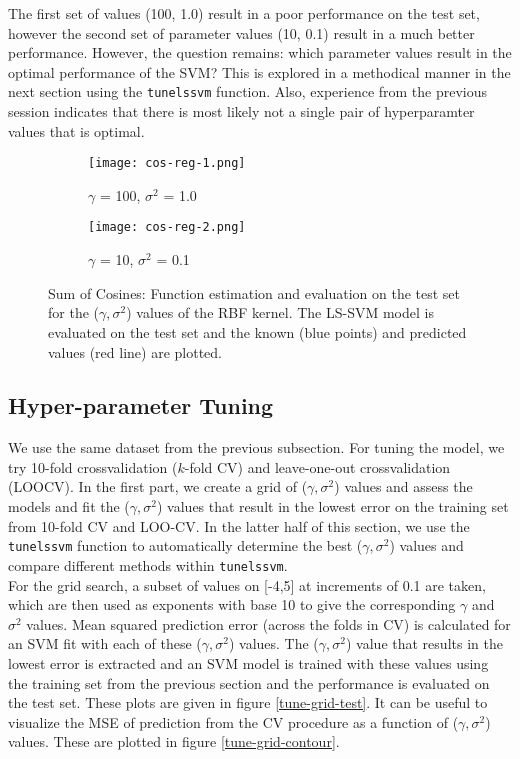 \documentclass[paper=a4, fontsize=11pt]{scrartcl} %
\numberwithin{equation}{section} %
\begin{document}
 The first set of values (100, 1.0) result in a poor performance on the test set, however the second set of parameter values (10, 0.1) result in a much better performance. However, the question remains: which parameter values result in the optimal performance of the SVM? This is explored in a methodical manner in the next section using the \texttt{tunelssvm} function. Also, experience from the previous session indicates that there is most likely not a single pair of hyperparamter values that is optimal.

\begin{figure}[ht]
\centering
	\begin{subfigure}[b]{0.5\textwidth}
		\centering
		\texttt{[image: cos-reg-1.png]}
		\caption{$\gamma$ = 100, $\sigma^2$ = 1.0}
	\end{subfigure}%
	\begin{subfigure}[b]{0.5\textwidth}
		\centering
		\texttt{[image: cos-reg-2.png]}
		\caption{$\gamma$ = 10, $\sigma^2$ = 0.1}
	\end{subfigure}
\caption{Sum of Cosines: Function estimation and evaluation on the test set for the ($\gamma, \sigma^2$) values of the RBF kernel. The LS-SVM model is evaluated on the test set and the known (blue points) and predicted values (red line) are plotted.}
\label{sum-cos-reg}
\end{figure}

\subsection{Hyper-parameter Tuning}

We use the same dataset from the previous subsection. For tuning the model, we try 10-fold crossvalidation ($k$-fold CV) and leave-one-out crossvalidation (LOOCV). In the first part, we create a grid of ($\gamma, \sigma^2$) values and assess the models and fit the ($\gamma, \sigma^2$) values that result in the lowest error on the training set from 10-fold CV and LOO-CV. In the latter half of this section, we use the \texttt{tunelssvm} function to automatically determine the best ($\gamma, \sigma^2$) values and compare different methods within \texttt{tunelssvm}.\\

For the grid search, a subset of values on [-4,5] at increments of 0.1 are taken, which are then used as exponents with base 10 to give the corresponding $\gamma$ and $\sigma^2$ values. Mean squared prediction error (across the folds in CV) is calculated for an SVM fit with each of these ($\gamma, \sigma^2$) values. The ($\gamma, \sigma^2$) value that results in the lowest error is extracted and an SVM model is trained with these values using the training set from the previous section and the performance is evaluated on the test set. These plots are given in figure \ref{tune-grid-test}. It can be useful to visualize the MSE of prediction from the CV procedure as a function of ($\gamma, \sigma^2$) values. These are plotted in figure \ref{tune-grid-contour}.\\
\end{document}
